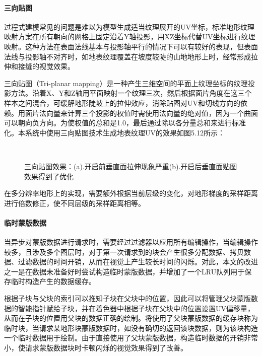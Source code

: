 \paragraph{三向贴图}
过程式建模常见的问题是难以为模型生成适当纹理展开的UV坐标，标准地形纹理映射方案在所有朝向的网格上固定沿着Y轴投影，用XZ坐标代替UV坐标进行纹理映射。这种方法在表面法线基本与投影轴平行的情况下可以有较好的表现，但表面法线与投影轴不对齐时，如地表纹理覆盖在坡度较陡的山地地形上时，经常形成拉伸和接缝的视觉效果。\par
三向贴图（Tri-planar mapping）是一种产生三维空间的平面上纹理坐标的纹理投影方法。沿着X、Y和Z轴用平面映射一个纹理三次，然后根据面片角度在这三个样本之间混合，可缓解地形陡坡上的拉伸效应，消除贴图对UV和切线方向的依赖。用面片法向量来计算三个投影的权值时需使用法向量的绝对值，因为一个曲面可以朝向负方向。为使权值的总和是1.0，最后通过除以各分量总和来进行标准化。本系统中使用三向贴图技术生成地表纹理UV的效果如图5.12所示：\par
\begin{figure}[H]
    \centering
     \\
    \caption{三向贴图效果：(a).开启前垂直面拉伸现象严重(b).开启后垂直面贴图效果得到了优化}
\end{figure}
在多分辨率地形上的实现，需要额外根据当前层级的变化，对地形梯度的采样距离进行倍数修正，使不同层级的采样距离相等。
\paragraph{临时蒙版数据}
当异步对蒙版数据进行请求时，需要经过过滤器以应用所有编辑操作，当编辑操作较多，且涉及多个图层时，对于第一次请求到的块会产生很多分配数据、拷贝数据、过滤数据的时间开销，从而在视觉上产生较长时间的闪烁。对此，本文的改进之一是在数据未准备好时尝试构造临时蒙版数据，并增加了一个LRU队列用于保存临时构造产生的数据缓存。\par
根据子块与父块的索引可以推知子块在父块中的位置，因此可以将管理父块蒙版数据的智能指针赋给子块，并在着色器中根据子块在父块中的位置设置UV偏移量，从而在子块的位置用父块的数据正确的绘制。将使用了父块蒙版数据的缓存块称为临时块，当请求某地形块蒙版数据时，如没有确切的返回该块数据，则为该块构造一个临时数据用于绘制。由于直接使用了父块蒙版数据，构造临时数据的开销非常小，使请求蒙版数据块时卡顿闪烁的视觉效果得到了改善。

